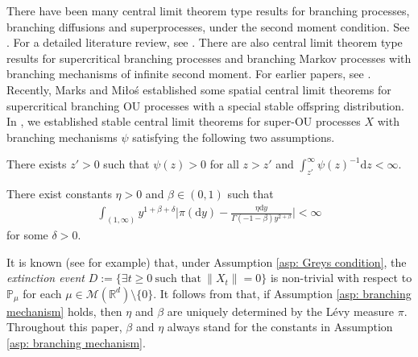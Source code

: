 \documentclass{amse-new}
\numberwithin{equation}{section}
\begin{document}
	There have been many central limit theorem type results for branching processes, branching diffusions and superprocesses, under the second moment condition.
	See \cite{AdamczakMilos2015CLT, AsmussenHering1983Branching, Athreya1969Limit,Athreya1969LimitB,Athreya1971Some, Heyde1970A-rate, HeydeBrown1871An-invariance, HeydeLeslie1971Improved, KestenStigum1966Additional,KestenStigum1966A-limit,Milos2012Spatial,RenSongZhang2014Central,RenSongZhang2014CentralB, RenSongZhang2015Central,RenSongZhang2017Central}.
	For a detailed literature review, see \cite[Section 1.1]{RenSongSunZhao2019Stable}.
	There are also  central  limit theorem type results for supercritical branching processes and branching Markov processes with branching mechanisms of infinite second moment.
	For earlier papers, see \cite{Asmussen76Convergence, Heyde1971Some}. 	
	Recently, Marks and 
	Mi{\l}o\'s
	\cite{MarksMilos2018CLT} established some spatial central limit theorems for supercritical branching OU processes with a special stable offspring distribution.
	In \cite{RenSongSunZhao2019Stable}, we established stable central limit theorems for super-OU processes $X$ with branching mechanisms $\psi$ satisfying the following two assumptions.

\begin{asp}
\label{asp: Greys condition}
	There exists $z' > 0$ such that $\psi(z) > 0$ for all $z>z'$ and  $\int_{z'}^\infty \psi(z)^{-1} \mathrm dz < \infty$.
\end{asp}

\begin{asp}
\label{asp: branching mechanism}
  	There exist constants $\eta > 0$ and $\beta \in (0,1)$ such that
\begin{align}
    \int_{(1,\infty)}y^{1+\beta +\delta}\Big|\pi(\mathrm dy)-\frac{\eta \mathrm dy}{\Gamma(-1-\beta)y^{2+\beta}}\Big| <\infty
\end{align}
	for some $\delta > 0$.
\end{asp}

	It is known (see \cite[Theorems 12.5 \& 12.7]{Kyprianou2014Fluctuations} for example) that, under Assumption \ref{asp: Greys condition}, the \emph{extinction event}
$
	D
	:=\{\exists t\geq 0~\text{such that}~ \|X_t\| =0 \}
$
	is non-trivial with respect to $\mathbb P_\mu$ for each  $\mu \in \mathcal M(\mathbb R^d)\setminus\{0\}$.
	It follows from \cite[Lemma 2.2]{RenSongSunZhao2019Stable}  that, if Assumption \ref{asp: branching mechanism} holds, then $\eta$ and $\beta$ are uniquely determined by the L\'evy measure $\pi$.
    Throughout this paper, $\beta$ and  $\eta$ always stand for the constants in
     Assumption \ref{asp: branching mechanism}.
\end{document}
